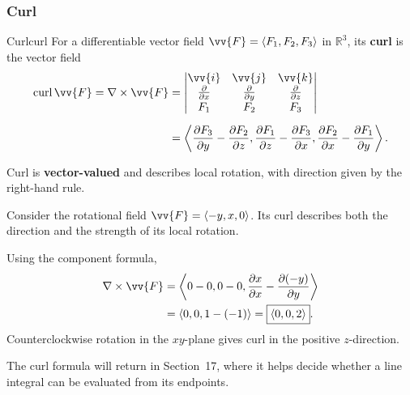 \subsubsection{Curl}

\begin{definition}{Curl}{curl}
For a differentiable vector field $\vv{F} = \ang{F_1,F_2,F_3}$ in $\mathbb{R}^3$, its \textbf{curl} is the vector field
\begin{align*}
    \operatorname{curl}\vv{F} = \nabla\times\vv{F}
    &= \begin{vmatrix}
        \vv{i} & \vv{j} & \vv{k}\\
        \pdv{x} & \pdv{y} & \pdv{z}\\
        F_1 & F_2 & F_3
    \end{vmatrix}\\[0.5em]
    &= \ang{\pdv{F_3}{y} - \pdv{F_2}{z},
        \pdv{F_1}{z} - \pdv{F_3}{x},
        \pdv{F_2}{x} - \pdv{F_1}{y}}.
\end{align*}

\end{definition}

Curl is \textbf{vector-valued} and describes local rotation, with direction given by the right-hand rule.

\begin{example}
Consider the rotational field $\vv{F} = \ang{-y,x,0}$. Its curl describes both the direction and the strength of its local rotation.

Using the component formula,
\begin{align*}
    \nabla\times\vv{F}
    &= \ang{0 - 0,0 - 0,\pdv{x}{x} - \pdv{(-y)}{y}}\\
    &= \ang{0,0,1 - (-1)}
    = \boxed{\ang{0,0,2}}.
\end{align*}
Counterclockwise rotation in the $xy$-plane gives curl in the positive $z$-direction.
\end{example}

The curl formula will return in Section~17, where it helps decide whether a line integral can be evaluated from its endpoints.
